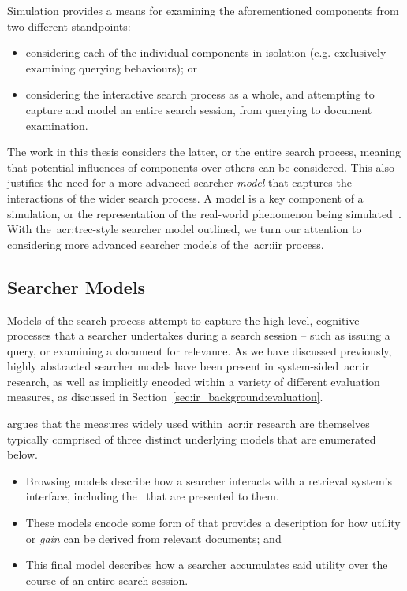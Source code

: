 Simulation provides a means for examining the aforementioned components from two different standpoints:

\begin{itemize}
    \item{considering each of the individual components in isolation (e.g. exclusively examining querying behaviours); or}
    \item{considering the interactive search process as a whole, and attempting to capture and model an entire search session, from querying to document examination.}
\end{itemize}

The work in this thesis considers the latter, or the entire search process, meaning that potential influences of components over others can be considered. This also justifies the need for a more advanced searcher \emph{model} that captures the interactions of the wider search process. A model is a key component of a simulation, or the representation of the real-world phenomenon being simulated~\citep{tocher1963art_of_simulation}. With the~\gls{acr:trec}-style searcher model outlined, we turn our attention to considering more advanced searcher models of the~\gls{acr:iir} process.

\subsection{Searcher Models}\label{sec:ir_background:user:models}
Models of the search process attempt to capture the high level, cognitive processes that a searcher undertakes during a search session -- such as issuing a query, or examining a document for relevance. As we have discussed previously, highly abstracted searcher models have been present in system-sided~\gls{acr:ir} research, as well as implicitly encoded within a variety of different evaluation measures, as discussed in Section~\ref{sec:ir_background:evaluation}.

\cite{carterette2011effectiveness_evaluation} argues that the measures widely used within~\gls{acr:ir} research are themselves typically comprised of three distinct underlying models that are enumerated below.

\begin{itemize}
    \item{ Browsing models describe how a searcher interacts with a retrieval system's interface, including the~ that are presented to them.}
    \item{ These models encode some form of  that provides a description for how utility or \emph{gain} can be derived from relevant documents; and}
    \item{ This final model describes how a searcher accumulates said utility over the course of an entire search session.}
\end{itemize}

